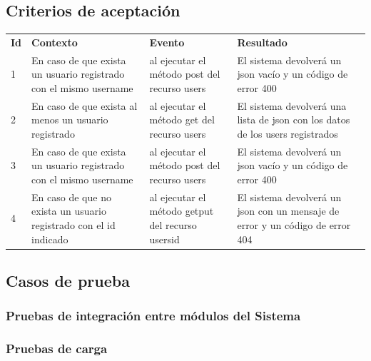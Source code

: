 \documentclass[a4paper,12pt]{article}
\begin{document}
\subsection{Criterios de aceptación}

\begin{center}
\begin{longtable}{|p{0.5cm}|p{4cm}|p{4cm}|p{5cm}|}
\hline \hline \rowcolor[gray]{0.9}
	\multicolumn{4}{||c|}{\textbf{Criterio de aceptación}} \\
    \hline  \rowcolor[gray]{0.9}
        \textbf{Id} &
        \textbf{Contexto} &
        \textbf{Evento}&
        \textbf{Resultado} \\
    \hline
1&En caso de que exista un usuario registrado con el mismo username & al ejecutar el método post del recurso \/users  & El sistema devolverá un json vacío y un código de error 400 \\ \hline
	\hline
2&En caso de que exista al menos un usuario registrado & al ejecutar el método get del recurso \/users  & El sistema devolverá una lista de json con los datos de los users registrados \\ 		\hline
	\hline
3&En caso de que exista un usuario registrado con el mismo username & al ejecutar el método post del recurso \/users  & El sistema devolverá un json vacío y un código de error 400 \\ \hline
    \hline
4&En caso de que no exista un usuario registrado con el id indicado & al ejecutar el método get\/put del recurso \/users\/id  & El sistema devolverá un json con un mensaje de error y un código de error 404 \\ \hline

  \end{longtable}
\end{center}

\subsection{Casos de prueba}

\subsubsection{Pruebas  de  integración  entre módulos del Sistema}

\subsubsection{ Pruebas de carga}
\end{document}
